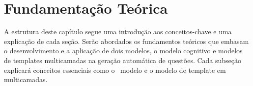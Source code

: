 \chapter{Fundamentação Teórica}\label{cap:fundamentacao-teorica}

A estrutura deste capítulo segue uma introdução aos conceitos-chave e uma explicação de cada seção. Serão abordados os fundamentos teóricos que embasam o desenvolvimento e a aplicação de dois modelos, o modelo cognitivo e modelos de templates multicamadas na geração automática de questões. Cada subseção explicará conceitos essenciais como o  modelo e o modelo de template em multicamadas.  